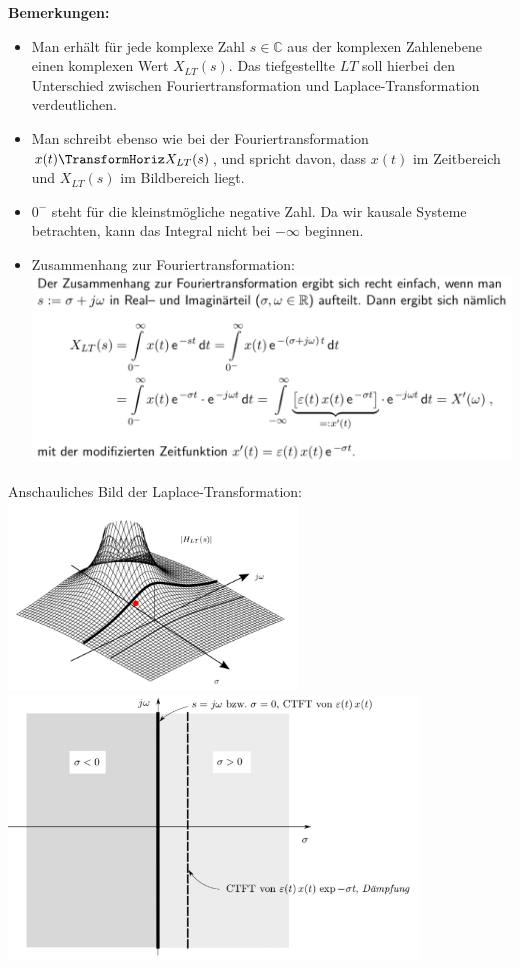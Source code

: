 \documentclass[12pt,a4paper]{scrartcl}
\begin{document}
  \noindent \textbf{Bemerkungen:}
  \begin{itemize}
    \item Man erhält für jede komplexe Zahl $s \in \mathbb{C}$ aus der komplexen Zahlenebene einen komplexen Wert $X_{LT}(s)$. Das tiefgestellte $LT$ soll hierbei den Unterschied zwischen Fouriertransformation und Laplace-Transformation verdeutlichen.
    \item Man schreibt ebenso wie bei der Fouriertransformation $x(t) \TransformHoriz X_{LT}(s)$, und spricht davon, dass $x(t)$ im Zeitbereich und $X_{LT}(s) $ im Bildbereich liegt.
    \item $0^-$ steht für die kleinstmögliche negative Zahl. Da wir kausale Systeme betrachten, kann das Integral nicht bei $-\infty$ beginnen. 
    \item Zusammenhang zur Fouriertransformation: \\ \includegraphics[height=5cm]{Pictures/ZusammenhangLT.png}
  \end{itemize} 

  \noindent Anschauliches Bild der Laplace-Transformation: \\
  \includegraphics[height=5cm]{Pictures/LT.png}
  \includegraphics[height=7cm]{Pictures/LT2.png}
\end{document}
